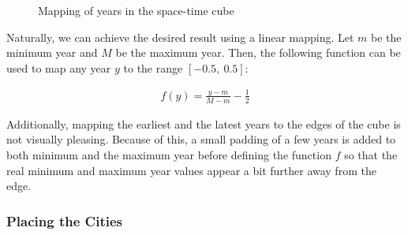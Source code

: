 \vspace{0.5cm}

\begin{figure}[hbt!]
    \begin{center}
    \end{center}
    \caption{Mapping of years in the space-time cube}
    \label{fig:figure3.12}
\end{figure}

Naturally, we can achieve the desired result using a linear mapping. Let $m$ be the minimum year and $M$ be the maximum year. Then, the following
function can be used to map any year $y$ to the range $[-0.5,\ 0.5]$:

\begin{align*}
    f(y) = \frac{y - m}{M - m} - \frac 12
\end{align*}

Additionally, mapping the earliest and the latest years to the edges of the cube is not visually pleasing. Because of this, a small padding of a
few years is added to both minimum and the maximum year before defining the function $f$ so that the real minimum and maximum year values appear a
bit further away from the edge.

\clearpage

\subsubsection{Placing the Cities}

